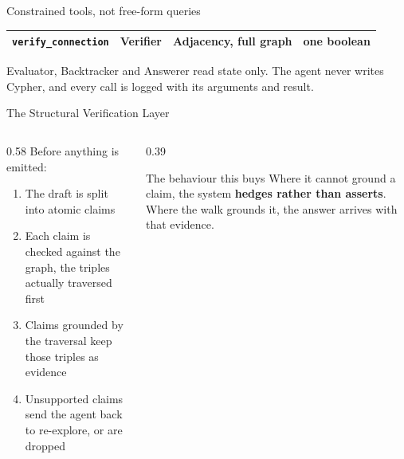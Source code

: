 \begin{frame}{Constrained tools, not free-form queries}
\begin{table}
\begin{tabular}{@{}llll@{}}
      \texttt{verify\_connection} & Verifier & Adjacency, full graph
                               & one boolean \\
      \bottomrule
    \end{tabular}
  \end{table}
  {\small Evaluator, Backtracker and Answerer read state only. The agent
  never writes Cypher, and every call is logged with its arguments and
  result.\par}
\end{frame}

\begin{frame}{The Structural Verification Layer}
  \begin{columns}[T]
    \begin{column}{0.58\textwidth}
      \let\raggedright\agrraggedright
      Before anything is emitted:
      \begin{enumerate}
        \item The draft is split into \alert{atomic claims}
        \item Each claim is checked against the graph, the \alert{triples
          actually traversed} first
        \item Claims grounded by the traversal keep those triples as
          \alert{evidence}
        \item Unsupported claims send the agent back to
          \alert{re-explore}, or are \alert{dropped}
      \end{enumerate}
    \end{column}
    \begin{column}{0.39\textwidth}
      \begin{block}{The behaviour this buys}
        \agrraggedright
        Where it cannot ground a claim, the system \textbf{hedges rather
        than asserts}. Where the walk grounds it, the answer arrives with
        that evidence.
      \end{block}
    \end{column}
  \end{columns}
\end{frame}

